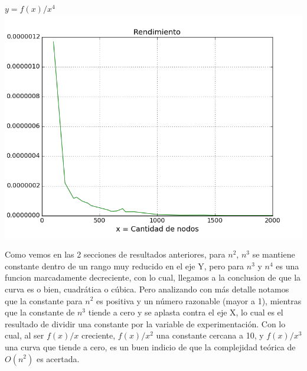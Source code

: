 \begin{center}
	\textbf{$y = f(x)/x^4$}\\
	\includegraphics[scale=0.7]{experimentos/bqlocal/rendimiento_aristas_cuadraticas_3/complexity_med_over_n_fourth.png}
\end{center}

Como vemos en las 2 secciones de resultados anteriores, para $n^2$, $n^3$ se mantiene constante dentro de un rango muy reducido en el eje Y, pero para $n^3$ y $n^4$ es una funcion marcadamente decreciente, con lo cual, llegamos a la conclusion de que la curva es o bien,  cuadr\'atica o c\'ubica. Pero analizando con m\'as detalle notamos que la constante para $n^2$ es positiva y un n\'umero razonable (mayor a 1), mientras que la constante de $n^3$ tiende a cero y se aplasta contra el eje X, lo cual es el resultado de dividir una constante por la variable de experimentaci\'on. Con lo cual, al ser $f(x)/x$ creciente,  $f(x)/x^2$ una constante cercana a 10, y $f(x)/x^3$ una curva que tiende a cero, es un buen indicio de que la complejidad te\'orica de $O(n^2)$ es acertada.

